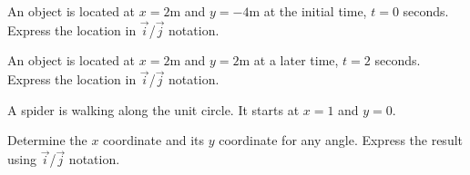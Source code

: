 \begin{problem}
\item An object is located at $x=2$m and $y=-4$m at the initial time,
  $t=0$ seconds. Express the location in $\vec{i}$/$\vec{j}$ notation.
  \vfill
\item An object is located at $x=2$m and $y=2$m at a later time,
  $t=2$ seconds. Express the location in $\vec{i}$/$\vec{j}$ notation.
  \vfill
\item A spider is walking along the unit circle. It starts at $x=1$
  and $y=0$.

  \scalebox{0.35}{}

  Determine the $x$ coordinate and its $y$ coordinate for any
  angle. Express the result using $\vec{i}$/$\vec{j}$ notation.

  \vfill
\end{problem}



